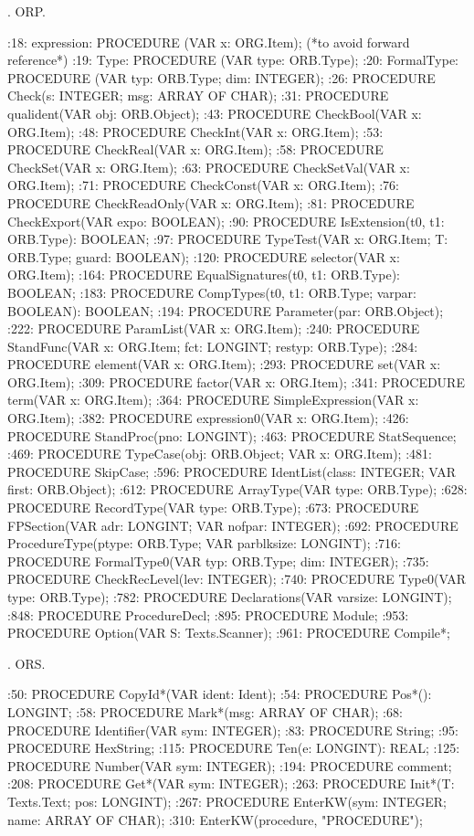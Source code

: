 . ORP.

:18:    expression: PROCEDURE (VAR x: ORG.Item);  (*to avoid forward reference*)
:19:    Type: PROCEDURE (VAR type: ORB.Type);
:20:    FormalType: PROCEDURE (VAR typ: ORB.Type; dim: INTEGER);
:26:  PROCEDURE Check(s: INTEGER; msg: ARRAY OF CHAR);
:31:  PROCEDURE qualident(VAR obj: ORB.Object);
:43:  PROCEDURE CheckBool(VAR x: ORG.Item);
:48:  PROCEDURE CheckInt(VAR x: ORG.Item);
:53:  PROCEDURE CheckReal(VAR x: ORG.Item);
:58:  PROCEDURE CheckSet(VAR x: ORG.Item);
:63:  PROCEDURE CheckSetVal(VAR x: ORG.Item);
:71:  PROCEDURE CheckConst(VAR x: ORG.Item);
:76:  PROCEDURE CheckReadOnly(VAR x: ORG.Item);
:81:  PROCEDURE CheckExport(VAR expo: BOOLEAN);
:90:  PROCEDURE IsExtension(t0, t1: ORB.Type): BOOLEAN;
:97:  PROCEDURE TypeTest(VAR x: ORG.Item; T: ORB.Type; guard: BOOLEAN);
:120:  PROCEDURE selector(VAR x: ORG.Item);
:164:  PROCEDURE EqualSignatures(t0, t1: ORB.Type): BOOLEAN;
:183:  PROCEDURE CompTypes(t0, t1: ORB.Type; varpar: BOOLEAN): BOOLEAN;
:194:  PROCEDURE Parameter(par: ORB.Object);
:222:  PROCEDURE ParamList(VAR x: ORG.Item);
:240:  PROCEDURE StandFunc(VAR x: ORG.Item; fct: LONGINT; restyp: ORB.Type);
:284:  PROCEDURE element(VAR x: ORG.Item);
:293:  PROCEDURE set(VAR x: ORG.Item);
:309:  PROCEDURE factor(VAR x: ORG.Item);
:341:  PROCEDURE term(VAR x: ORG.Item);
:364:  PROCEDURE SimpleExpression(VAR x: ORG.Item);
:382:  PROCEDURE expression0(VAR x: ORG.Item);
:426:  PROCEDURE StandProc(pno: LONGINT);
:463:  PROCEDURE StatSequence;
:469:    PROCEDURE TypeCase(obj: ORB.Object; VAR x: ORG.Item);
:481:    PROCEDURE SkipCase;
:596:  PROCEDURE IdentList(class: INTEGER; VAR first: ORB.Object);
:612:  PROCEDURE ArrayType(VAR type: ORB.Type);
:628:  PROCEDURE RecordType(VAR type: ORB.Type);
:673:  PROCEDURE FPSection(VAR adr: LONGINT; VAR nofpar: INTEGER);
:692:  PROCEDURE ProcedureType(ptype: ORB.Type; VAR parblksize: LONGINT);
:716:  PROCEDURE FormalType0(VAR typ: ORB.Type; dim: INTEGER);
:735:  PROCEDURE CheckRecLevel(lev: INTEGER);
:740:  PROCEDURE Type0(VAR type: ORB.Type);
:782:  PROCEDURE Declarations(VAR varsize: LONGINT);
:848:  PROCEDURE ProcedureDecl;
:895:  PROCEDURE Module;
:953:  PROCEDURE Option(VAR S: Texts.Scanner);
:961:  PROCEDURE Compile*;

. ORS.

:50:  PROCEDURE CopyId*(VAR ident: Ident);
:54:  PROCEDURE Pos*(): LONGINT;
:58:  PROCEDURE Mark*(msg: ARRAY OF CHAR);
:68:  PROCEDURE Identifier(VAR sym: INTEGER);
:83:  PROCEDURE String;
:95:  PROCEDURE HexString;
:115:  PROCEDURE Ten(e: LONGINT): REAL;
:125:  PROCEDURE Number(VAR sym: INTEGER);
:194:  PROCEDURE comment;
:208:  PROCEDURE Get*(VAR sym: INTEGER);
:263:  PROCEDURE Init*(T: Texts.Text; pos: LONGINT);
:267:  PROCEDURE EnterKW(sym: INTEGER; name: ARRAY OF CHAR);
:310:  EnterKW(procedure, "PROCEDURE");

